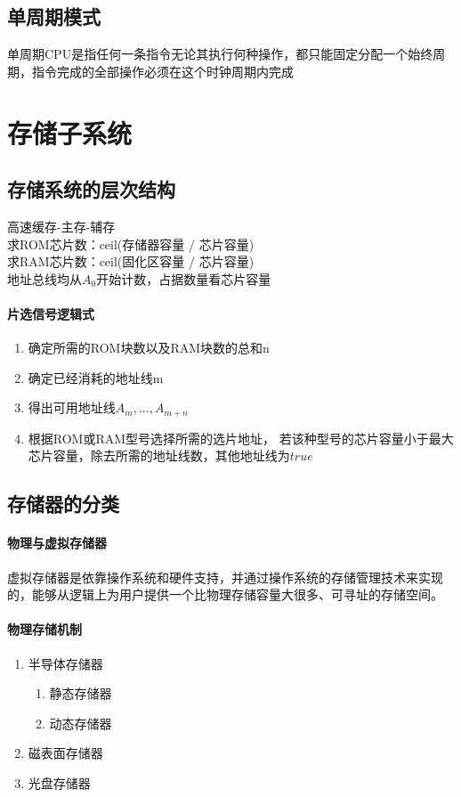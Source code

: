 \documentclass[a4paper, 12pt, oneside]{ctexart}
\begin{document}
	\subsection{单周期模式}
	单周期CPU是指任何一条指令无论其执行何种操作，都只能固定分配一个始终周期，指令完成的全部操作必须在这个时钟周期内完成
	
	\section{存储子系统}
	\subsection{存储系统的层次结构}
	高速缓存-主存-辅存\\
	求ROM芯片数：ceil(存储器容量 / 芯片容量)\\
	求RAM芯片数：ceil(固化区容量 / 芯片容量)\\
	地址总线均从$A_{0}$开始计数，占据数量看芯片容量
	\paragraph{片选信号逻辑式}
	\begin{enumerate}
		\item 确定所需的ROM块数以及RAM块数的总和n
		\item 确定已经消耗的地址线m
		\item 得出可用地址线$A_{m}, ..., A_{m + n}$
		\item 根据ROM或RAM型号选择所需的选片地址， 若该种型号的芯片容量小于最大芯片容量，除去所需的地址线数，其他地址线为$true$
	\end{enumerate}
	\subsection{存储器的分类}
	\paragraph{物理与虚拟存储器}
	虚拟存储器是依靠操作系统和硬件支持，并通过操作系统的存储管理技术来实现的，能够从逻辑上为用户提供一个比物理存储容量大很多、可寻址的存储空间。
	\paragraph{物理存储机制}
	\begin{enumerate}
		\item 半导体存储器
		\begin{enumerate}
			\item 静态存储器
			\item 动态存储器
		\end{enumerate}
		\item 磁表面存储器
		\item 光盘存储器
	\end{enumerate}
\end{document}
